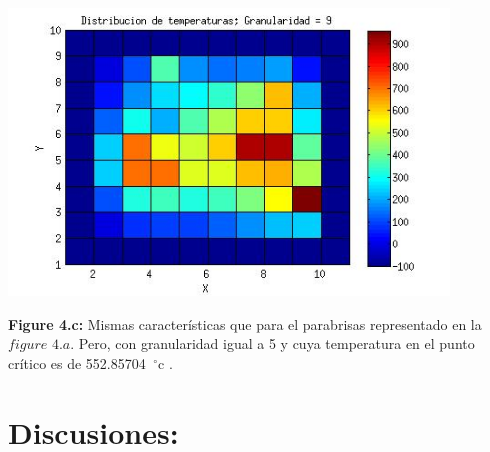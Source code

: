 \documentclass[a4paper]{article}
\begin{document}
\includegraphics[width=\textwidth,height=3.0in,keepaspectratio
]{82x71h9.jpg} \newline
\begin {flushleft}
\textbf{Figure 4.c:} Mismas características que para el parabrisas representado en la $figure$ $4.a$. Pero, con granularidad igual a 5 y cuya temperatura en el punto crítico es de 552.85704\hspace{-1.5mm}$\phantom{a}^{\circ}$c .
\end{flushleft}


\section{Discusiones:}
\end{document}
